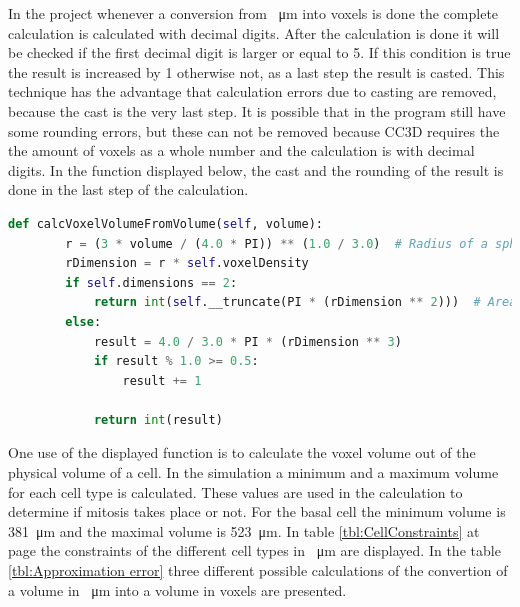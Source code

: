 In the project whenever a conversion from \SI{}{\micro\metre} into voxels is done the complete calculation is calculated with decimal digits. After the calculation is done it will be checked if the first decimal digit is larger or equal to 5. If this condition is true the result is increased by 1 otherwise not, as a last step the result is casted. This technique has the advantage that calculation errors due to casting are removed, because the cast is the very last step. It is possible that in the program still have some rounding errors, but these can not be removed because \ac{CC3D} requires the the amount of voxels as a whole number and the calculation is with decimal digits. In the function displayed below, the cast and the rounding of the result is done in the last step of the calculation.

\begin{lstlisting}[language=Python, caption = Function to calculate the volume of a sphere in voxels out of a given physical volume. First out of the given physical volume the radius will be calculated. Then the radius will be converted into the voxel unit. Next\, the volume of the voxel sphere will be calculated and as last step\, the result will be rounded and casted.]
   def calcVoxelVolumeFromVolume(self, volume):
        r = (3 * volume / (4.0 * PI)) ** (1.0 / 3.0)  # Radius of a sphere with known volume.
        rDimension = r * self.voxelDensity
        if self.dimensions == 2:
            return int(self.__truncate(PI * (rDimension ** 2)))  # Area of a circle.
        else:
            result = 4.0 / 3.0 * PI * (rDimension ** 3)
            if result % 1.0 >= 0.5:
                result += 1

            return int(result)
\end{lstlisting}

One use of the displayed function is to calculate the voxel volume out of the physical volume of a cell. In the simulation a minimum and a maximum volume for each cell type is calculated. These values are used in the calculation to determine if mitosis takes place or not. \newline
For the basal cell the minimum volume is \SI{381}{\micro\metre} and the maximal volume is \SI{523}{\micro\metre}. In table \ref{tbl:CellConstraints} at page \pageref{tbl:CellConstraints} the constraints of the different cell types in \SI{}{\micro\metre} are displayed. In the table \ref{tbl:Approximation error} three different possible calculations of the convertion of a volume in \SI{}{\micro\metre} into a volume in voxels are presented.

